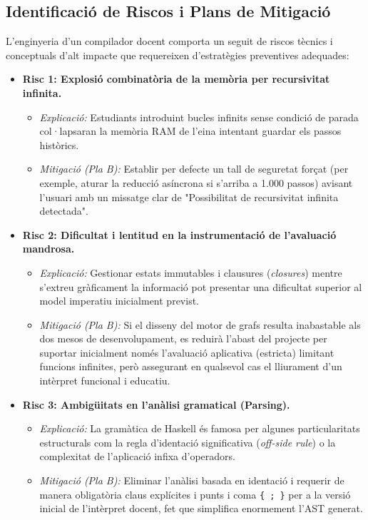 \subsection{Identificació de Riscos i Plans de Mitigació}
L'enginyeria d'un compilador docent comporta un seguit de riscos tècnics i conceptuals d'alt impacte que requereixen d'estratègies preventives adequades:
\begin{itemize}
    \item \textbf{Risc 1: Explosió combinatòria de la memòria per recursivitat infinita.}
    \begin{itemize}
        \item \textit{Explicació:} Estudiants introduint bucles infinits sense condició de parada col·lapsaran la memòria RAM de l'eina intentant guardar els passos històrics.
        \item \textit{Mitigació (Pla B):} Establir per defecte un tall de seguretat forçat (per exemple, aturar la reducció asíncrona si s'arriba a 1.000 passos) avisant l'usuari amb un missatge clar de "Possibilitat de recursivitat infinita detectada".
    \end{itemize}
    \item \textbf{Risc 2: Dificultat i lentitud en la instrumentació de l'avaluació mandrosa.}
    \begin{itemize}
        \item \textit{Explicació:} Gestionar estats immutables i clausures (\textit{closures}) mentre s'extreu gràficament la informació pot presentar una dificultat superior al model imperatiu inicialment previst.
        \item \textit{Mitigació (Pla B):} Si el disseny del motor de grafs resulta inabastable als dos mesos de desenvolupament, es reduirà l'abast del projecte per suportar inicialment només l'avaluació aplicativa (estricta) limitant funcions infinites, però assegurant en qualsevol cas el lliurament d'un intèrpret funcional i educatiu.
    \end{itemize}
    \item \textbf{Risc 3: Ambigüitats en l'anàlisi gramatical (Parsing).}
    \begin{itemize}
        \item \textit{Explicació:} La gramàtica de Haskell és famosa per algunes particularitats estructurals com la regla d'identació significativa (\textit{off-side rule}) o la complexitat de l'aplicació infixa d'operadors.
        \item \textit{Mitigació (Pla B):} Eliminar l'anàlisi basada en identació i requerir de manera obligatòria claus explícites i punts i coma \texttt{\{ ; \}} per a la versió inicial de l'intèrpret docent, fet que simplifica enormement l'AST generat.
    \end{itemize}
\end{itemize}


